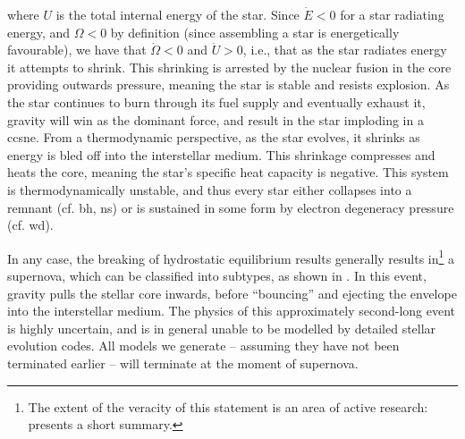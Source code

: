 where $U$ is the total internal energy of the star. Since $\dot{E}<0$ for a star radiating energy, and $\Omega<0$ by definition (since assembling a star is energetically favourable), we have that $\dot{\Omega}<0$ and $\dot{U}>0$, i.e., that as the star radiates energy it attempts to shrink. This shrinking is arrested by the nuclear fusion in the core providing outwards pressure, meaning the star is stable and resists explosion. As the star continues to burn through its fuel supply and eventually exhaust it, gravity will win as the dominant force, and result in the star imploding in a \gls{ccsne}. From a thermodynamic perspective, as the star evolves, it shrinks as energy is bled off into the interstellar medium. This shrinkage compresses and heats the core, meaning the star's specific heat capacity is negative. This system is thermodynamically unstable, and thus every star either collapses into a remnant (cf. \gls{bh}, \gls{ns}) or is sustained in some form by electron degeneracy pressure (cf. \gls{wd}).

In any case, the breaking of hydrostatic equilibrium results generally results in\footnote{The extent of the veracity of this statement is an area of active research: \citet{Reynolds:2015} presents a short summary.} a supernova, which can be classified into subtypes, as shown in . In this event, gravity pulls the stellar core inwards, before ``bouncing'' and ejecting the envelope into the interstellar medium. The physics of this approximately second-long event is highly uncertain, and is in general unable to be modelled by detailed stellar evolution codes. All models we generate -- assuming they have not been terminated earlier -- will terminate at the moment of supernova.

